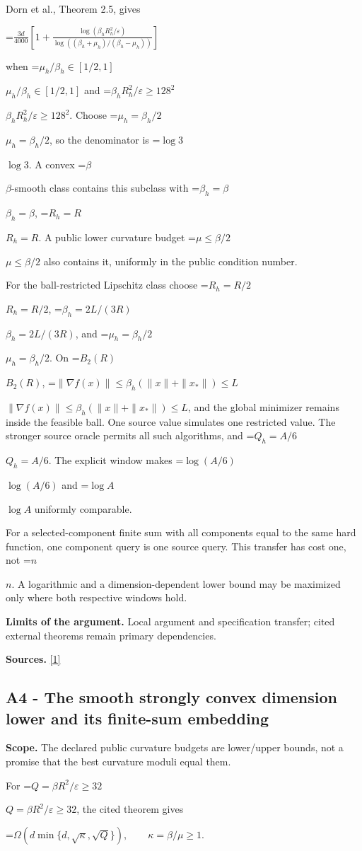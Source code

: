 \documentclass[10pt,a4paper]{article}
\newcommand{\AtlasMath}[1]{\par\begingroup\centering\setbox0=\hbox{$\displaystyle #1$}\ifdim\wd0>1.4\linewidth\typeout{ATLAS WIDE FORMULA: \the\wd0}\fi\ifdim\wd0>\linewidth\resizebox{\linewidth}{!}{\box0}\else\box0\fi\par\endgroup}
\newcommand{\AtlasInlineMath}[1]{\begingroup\setbox0=\hbox{$#1$}\ifdim\wd0>.4\linewidth\endgroup\AtlasMath{#1}\else\endgroup$#1$\fi}
\begin{document}
Dorn et al., Theorem 2.5, gives

\AtlasMath{\frac{3d}{4000}\left[1+\frac{\log(\beta_hR_h^2/\varepsilon)}{\log((\beta_h+\mu_h)/(\beta_h-\mu_h))}\right]}

when \AtlasInlineMath{\mu_h/\beta_h\in[1/2,1]} and \AtlasInlineMath{\beta_hR_h^2/\varepsilon\ge128^2}. Choose \AtlasInlineMath{\mu_h=\beta_h/2}, so the denominator is \AtlasInlineMath{\log3}. A convex \AtlasInlineMath{\beta}-smooth class contains this subclass with \AtlasInlineMath{\beta_h=\beta}, \AtlasInlineMath{R_h=R}. A public lower curvature budget \AtlasInlineMath{\mu\le\beta/2} also contains it, uniformly in the public condition number.

For the ball-restricted Lipschitz class choose \AtlasInlineMath{R_h=R/2}, \AtlasInlineMath{\beta_h=2L/(3R)}, and \AtlasInlineMath{\mu_h=\beta_h/2}. On \AtlasInlineMath{B_2(R)}, \AtlasInlineMath{\|\nabla f(x)\|\le\beta_h(\|x\|+\|x_*\|)\le L}, and the global minimizer remains inside the feasible ball. One source value simulates one restricted value. The stronger source oracle permits all such algorithms, and \AtlasInlineMath{Q_h=A/6}. The explicit window makes \AtlasInlineMath{\log(A/6)} and \AtlasInlineMath{\log A} uniformly comparable.

For a selected-component finite sum with all components equal to the same hard function, one component query is one source query. This transfer has cost one, not \AtlasInlineMath{n}. A logarithmic and a dimension-dependent lower bound may be maximized only where both respective windows hold.

\textbf{Limits of the argument.} Local argument and specification transfer; cited external theorems remain primary dependencies.

\textbf{Sources.} \href{https://arxiv.org/html/2610.00345v1}{[1]}

\subsection{A4 - The smooth strongly convex dimension lower and its finite-sum embedding}
\textbf{Scope.} The declared public curvature budgets are lower/upper bounds, not a promise that the best curvature moduli equal them.

For \AtlasInlineMath{Q=\beta R^2/\varepsilon\ge32}, the cited theorem gives

\AtlasMath{\Omega\!\left(d\min\{d,\sqrt\kappa,\sqrt Q\}\right),\qquad\kappa=\beta/\mu\ge1.}
\end{document}
